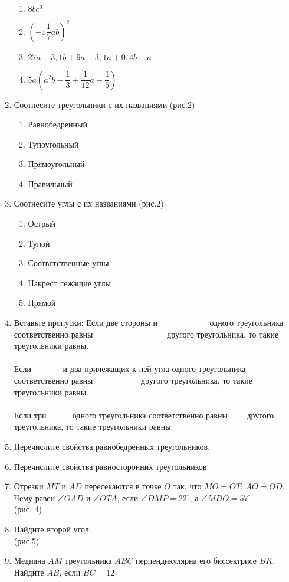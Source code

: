 \documentclass[12pt, a4paper]{article}
\begin{document}
\begin{enumerate}
\begin{multicols}{2}
\begin{enumerate}[label=\asbuk*)]
	\item  $8bc^3$
	\item $\left( -1\dfrac{1}{7}ab\right)^2 $
	\item $27a-3,1b+9a+3,1a+0,4b-a$
	\item $5a(a^2b-\dfrac{1}{3}+\dfrac{1}{12}a-\dfrac{1}{5})$
	\end{enumerate}
	\end{multicols}
	\item Соотнесите треугольники с их названиями
	(рис.2)
	\begin{enumerate}[label=\asbuk*)]
		\item Равнобедренный
		\item Тупоугольный
		\item Прямоугольный
		\item Правильный
	\end{enumerate}
		\item Соотнесите углы с их названиями
		(рис.2)
		\begin{enumerate}[label=\asbuk*)]
			\item Острый
			\item Тупой
			\item Соответственные углы
			\item Накрест лежащие углы
			\item Прямой
		\end{enumerate}
	\item Вставьте пропуски:
	Если две стороны и $\,\,\,\,\,\,\,\,\,\,\,\,\,\,\,\,\,\,\,\,\,\,\,\,\,\,\,\,\,\,\,\,\,\,$ одного треугольника соответственно равны $\,\,\,\,\,\,\,\,\,\,\,\,\,\,\,\,\,\,\,\,\,\,\,\,\,\,\,\,\,\,\,\,\,\,\,\,\,\,\,\,\,\,\,\,\,\,\,\,\,\,$ другого треугольника, то такие треугольники равны.\\\\
	Если $\,\,\,\,\,\,\,\,\,\,\,\,\,\,\,\,\,\,\,$ и два прилежащих к ней угла одного треугольника соответственно равны $\,\,\,\,\,\,\,\,\,\,\,\,\,\,\,\,\,\,\,\,\,\,\,\,\,\,\,\,\,\,\,$ другого треугольника, то такие треугольники равны.\\\\
	Если три $\,\,\,\,\,\,\,\,\,\,\,\,\,\,\,$ одного треугольника соответственно равны $\,\,\,\,\,\,\,\,\,\,$ другого треугольника, то такие треугольники равны.
	\item Перечислите свойства равнобедренных треугольников.
	\item Перечислите свойства равносторонних треугольников.
	\item Отрезки $MT$ и $AD$ пересекаются в точке $O$ так, что $MO=OT$; $AO=OD$. Чему равен $\angle OAD$ и $\angle OTA$, если $\angle DMP=22^{\circ}$, а $\angle MDO=57^{\circ}$\\
	(рис. 4)
	\item Найдите второй угол.\\
	(рис.5) %
	\item Медиана $AM$ треугольника $ABC$ перпендикулярна его биссектрисе $BK$. Найдите $AB$, если $BC=12$
	\end{enumerate}
\end{document}
